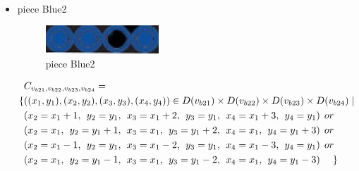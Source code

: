 \begin{appendices}
\begin{itemize}
\begin{align*}
\end{align*}  
  \item piece Blue2\\
\begin{figure}[H]
    \centering
    \includegraphics[width=0.4\textwidth]{figs/blue2.jpg}
    \caption{piece Blue2}
\end{figure}
  \begin{align*}
&\Const{b21}{b22}{b23}{b24}=\\
\{&((x_{1},y_{1}),(x_{2},y_{2}),(x_{3},y_{3}),(x_{4},y_{4}))\in \Domain{b21}\times \Domain{b22}\times\Domain{b23}\times\Domain{b24}\mid\\
&(x_{2} = x_{1} + 1,\hspace{1ex}y_{2} = y_{1},\hspace{1ex}x_{3} = x_{1} + 2, \hspace{1ex}y_{3} = y_{1},\hspace{1ex}x_{4} = x_{1}+3,\hspace{1ex}y_{4} = y_{1})\hspace{1ex} or\\
&(x_{2} = x_{1},\hspace{1ex}y_{2} = y_{1}+1,\hspace{1ex}x_{3} = x_{1}, \hspace{1ex}y_{3} = y_{1}+2,\hspace{1ex}x_{4} = x_{1},\hspace{1ex}y_{4} = y_{1}+3)\hspace{1ex} or\\
&(x_{2} = x_{1}-1,\hspace{1ex}y_{2} = y_{1},\hspace{1ex}x_{3} = x_{1}-2,\hspace{1ex} y_{3} = y_{1},\hspace{1ex}x_{4} = x_{1}-3,\hspace{1ex}y_{4} = y_{1})\hspace{1ex} or\\
&(x_{2} = x_{1},\hspace{1ex}y_{2} = y_{1}-1,\hspace{1ex}x_{3} = x_{1}, \hspace{1ex}y_{3} = y_{1}-2,\hspace{1ex}x_{4} = x_{1},\hspace{1ex}y_{4} = y_{1}-3)\hspace{3ex} \}

\end{align*}
\end{itemize}
\end{appendices}
